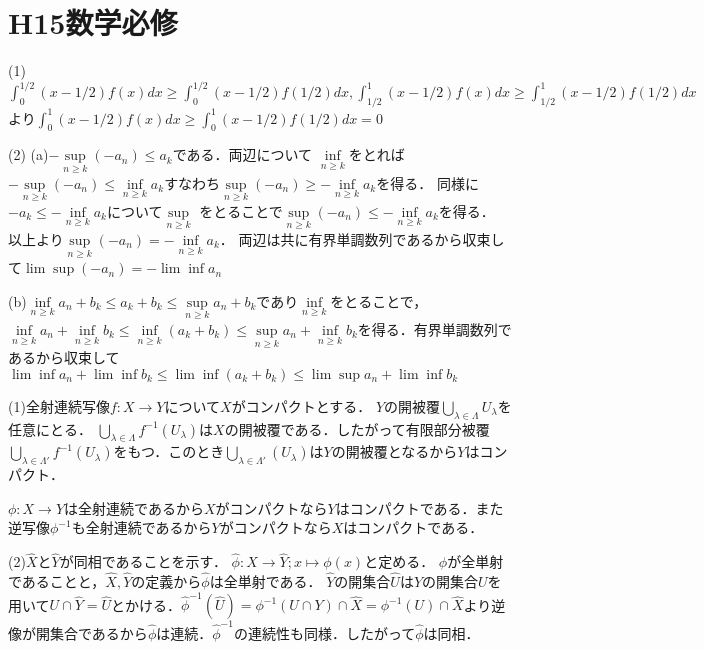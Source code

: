 \documentclass[
		book,
		head_space=20mm,
		foot_space=20mm,
		gutter=10mm,
		line_length=190mm
]{jlreq}
\begin{document}
\section{H15数学必修}
(1) $
	\int_0^{1/2}(x-1/2)f(x)dx \ge \int_0^{1/2}(x-1/2)f(1/2)dx,
	\int_{1/2}^1(x-1/2)f(x)dx \ge \int_{1/2}^1(x-1/2)f(1/2)dx$
	より$\int_0^1 (x-1/2)f(x)dx \ge \int_0^1(x-1/2)f(1/2)dx=0$

(2) (a)$-\sup\limits_{n\ge k} (-a_n) \le a_k$である．両辺について
$\inf\limits_{n\ge k}$をとれば$-\sup\limits_{n\ge k} (-a_n) \le \inf\limits_{n\ge k}a_k$すなわち$\sup\limits_{n\ge k} (-a_n) \ge -\inf\limits_{n\ge k}a_k$を得る．
同様に$-a_k \le -\inf\limits_{n\ge k}a_k$について$\sup\limits_{n\ge k}$
をとることで$\sup\limits_{n\ge k} (-a_n) \le -\inf\limits_{n\ge k}a_k$を得る．
以上より$\sup\limits_{n\ge k} (-a_n) = -\inf\limits_{n\ge k}a_k$．
両辺は共に有界単調数列であるから収束して$\lim\sup(-a_n)=-\lim\inf a_n$

(b)$\inf\limits_{n\ge k} a_n + b_k \le a_k+b_k\le \sup\limits_{n\ge k} a_n + b_k$であり$\inf\limits_{n\ge k}$をとることで，
$\inf\limits_{n\ge k} a_n + \inf\limits_{n\ge k}b_k \le \inf\limits_{n\ge k}(a_k+b_k)\le \sup\limits_{n\ge k} a_n + \inf\limits_{n\ge k}b_k$を得る．有界単調数列であるから収束して$\lim\inf a_n + \lim\inf b_k \le \lim\inf(a_k+b_k)\le \lim\sup a_n + \lim\inf b_k$

(1)全射連続写像$f\colon X\rightarrow Y$について$X$がコンパクトとする．
$Y$の開被覆$\bigcup\limits_{\lambda\in \Lambda} U_{\lambda}$を任意にとる．
$\bigcup\limits_{\lambda\in \Lambda} f^{-1}(U_{\lambda})$は$X$の開被覆である．したがって有限部分被覆$\bigcup\limits_{\lambda\in \Lambda'} f^{-1}(U_{\lambda})$をもつ．このとき$\bigcup\limits_{\lambda\in \Lambda'} (U_{\lambda})$は$Y$の開被覆となるから$Y$はコンパクト．

$\phi\colon X \rightarrow Y$は全射連続であるから$X$がコンパクトなら$Y$はコンパクトである．また逆写像$\phi^{-1}$も全射連続であるから$Y$がコンパクトなら$X$はコンパクトである．

(2)$\hat{X}$と$\hat{Y}$が同相であることを示す．
$\hat{\phi}\colon \hat{X}\rightarrow \hat{Y};x\mapsto \phi(x)$と定める．
$\phi$が全単射であることと，$\hat{X},\hat{Y}$の定義から$\hat{\phi}$は全単射である．
$\hat{Y}$の開集合$\hat{U}$は$Y$の開集合$U$を用いて$U\cap \hat{Y}= \hat{U}$とかける．$\hat{\phi}^{-1}(\hat{U})=\phi^{-1}(U\cap Y)\cap \hat{X}=\phi^{-1}(U)\cap \hat{X}$より逆像が開集合であるから$\hat{\phi}$は連続．$\hat{\phi}^{-1}$の連続性も同様．したがって$\hat{\phi}$は同相．
\end{document}
